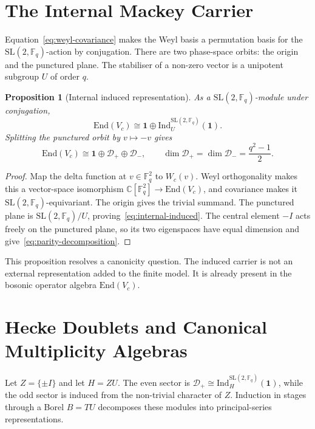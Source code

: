 \documentclass[11pt,a4paper]{article}
\newtheorem{proposition}[theorem]{Proposition}
\theoremstyle{definition}
\theoremstyle{remark}
\newcommand{\C}{\mathbb{C}}
\newcommand{\Fq}{\mathbb{F}_q}
\newcommand{\G}{\mathrm{SL}(2,\Fq)}
\newcommand{\End}{\mathrm{End}}
\newcommand{\Ind}{\mathrm{Ind}}
\newcommand{\Id}{\mathbf{1}}
\newcommand{\Dplus}{\mathcal{D}_{+}}
\newcommand{\Dminus}{\mathcal{D}_{-}}
\begin{document}
\section{The Internal Mackey Carrier}
\label{sec:carrier}

Equation~\eqref{eq:weyl-covariance} makes the Weyl basis a permutation basis for the
$\G$-action by conjugation.
There are two phase-space orbits: the origin and the punctured plane.
The stabiliser of a non-zero vector is a unipotent subgroup $U$ of order $q$.

\begin{proposition}[Internal induced representation]
  \label{prop:internal-carrier}
  As a $\G$-module under conjugation,
  \begin{equation}
    \End(V_c)\cong\Id\oplus\Ind_U^{\G}(\Id).
    \label{eq:internal-induced}
  \end{equation}
  Splitting the punctured orbit by $v\mapsto-v$ gives
  \begin{equation}
    \End(V_c)\cong\Id\oplus\Dplus\oplus\Dminus,
    \qquad
    \dim\Dplus=\dim\Dminus=\frac{q^2-1}{2}.
    \label{eq:parity-decomposition}
  \end{equation}
\end{proposition}

\begin{proof}
  Map the delta function at $v\in\Fq^2$ to $W_c(v)$.
  Weyl orthogonality makes this a vector-space isomorphism
  $\C[\Fq^2]\to\End(V_c)$, and covariance makes it $\G$-equivariant.
  The origin gives the trivial summand.
  The punctured plane is $\G/U$, proving~\eqref{eq:internal-induced}.
  The central element $-I$ acts freely on the punctured plane, so its two eigenspaces have
  equal dimension and give~\eqref{eq:parity-decomposition}.
\end{proof}

This proposition resolves a canonicity question.
The induced carrier is not an external representation added to the finite model.
It is already present in the bosonic operator algebra $\End(V_c)$.

\section{Hecke Doublets and Canonical Multiplicity Algebras}
\label{sec:hecke}

Let $Z=\{\pm I\}$ and let $H=ZU$.
The even sector is $\Dplus\cong\Ind_H^{\G}(\Id)$, while the odd sector is induced from the
non-trivial character of $Z$.
Induction in stages through a Borel $B=TU$ decomposes these modules into principal-series
representations.
\end{document}
